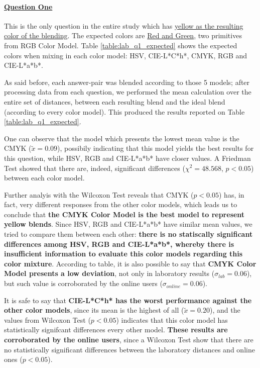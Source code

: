 \paragraph{\ul{Question One}}
%
This is the only question in the entire study which has \ul{yellow as the resulting color of the blending}. The expected colors are \ul{Red and Green}, two primitives from RGB Color Model. Table \ref{table:lab_q1_expected} shows the
expected colors when mixing in each color model: HSV, CIE-L*C*h*, CMYK, RGB and CIE-L*a*b*. \par
%
As said before, each answer-pair was blended according to those 5 models; after processing data from each question, we performed the mean calculation over the entire set of distances, between each resulting blend and the ideal blend (according
to every color model). This produced the results reported on Table \ref{table:lab_q1_expected}. \par
%
One can observe that the model which presents the lowest mean value is the CMYK ($\tilde{x} = 0.09$), possibily indicating that this model yields the best results for this question, while HSV, RGB and CIE-L*a*b* have closer values.
A Friedman Test showed that there are, indeed, significant differences ($\chi^2 = 48.568$, $p < 0.05$) between each color model. \par
%
Further analyis with the Wilcoxon Test reveals that CMYK ($p < 0.05$) has, in fact, very different responses from the other color models, which leads us to conclude that \textbf{the CMYK Color Model is the best model to represent yellow blends}.
Since HSV, RGB and CIE-L*a*b* have similar mean values, we tried to compare them between each other: \textbf{there is no statiscally significant differences among HSV, RGB and CIE-L*a*b*, whereby there is insufficient information to evaluate this
color models regarding this color mixture}. According to table, it is also possible to say that \textbf{CMYK Color Model presents a low deviation}, not only in laboratory results ($\sigma_{lab} = 0.06$), but
such value is corroborated by the online users ($\sigma_{online} = 0.06$). \par
%
It is safe to say that \textbf{CIE-L*C*h* has the worst performance against the other color models}, since its mean is the highest of all ($\tilde{x} = 0.20$), and the values from Wilcoxon Test ($p < 0.05$) indicates that this color model has
statistically signifcant differences every other model. \textbf{These results are corroborated by the online users}, since a Wilcoxon Test show that there are no statistically significant differences between the laboratory distances and online ones ($p < 0.05$).
